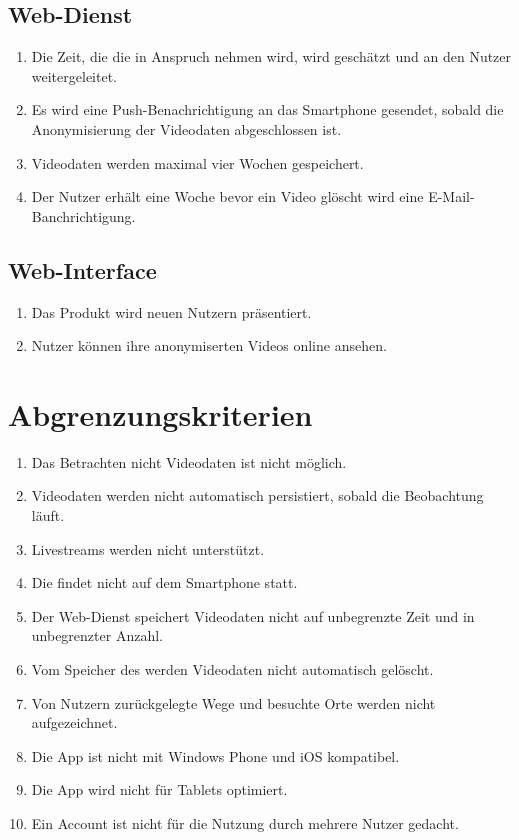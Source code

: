 \subsection{Web-Dienst}
	\begin{enumerate}
	\renewcommand{\labelenumi}{\textbf{\theenumi}}
	\renewcommand{\theenumi}{WK\arabic{enumi}0}
	\setcounter{enumi}{199}
	\item Die Zeit, die die  in Anspruch nehmen wird, wird geschätzt und an den Nutzer weitergeleitet.
	\item Es wird eine Push-Benachrichtigung an das \gls{Smartphone} gesendet, sobald die Anonymisierung der Videodaten abgeschlossen ist.
	\item Videodaten werden maximal vier Wochen gespeichert.
	\item Der Nutzer erhält eine Woche bevor ein Video glöscht wird eine \gls{E-Mail}-Banchrichtigung.
	\end{enumerate}
\subsection{Web-Interface}
	\begin{enumerate}
	\renewcommand{\labelenumi}{\textbf{\theenumi}}
	\renewcommand{\theenumi}{WK\arabic{enumi}0}
	\setcounter{enumi}{299}
	\item Das Produkt wird neuen Nutzern präsentiert.
	\item Nutzer können ihre anonymiserten Videos online ansehen.
	\end{enumerate}

\section{Abgrenzungskriterien}
	\begin{enumerate}
	\renewcommand{\labelenumi}{\textbf{\theenumi}}
	\renewcommand{\theenumi}{AK\arabic{enumi}0}
	\setcounter{enumi}{99}
	\item Das Betrachten nicht  Videodaten ist nicht möglich.
	\item Videodaten werden nicht automatisch persistiert, sobald die Beobachtung läuft.
	\item \glspl{Livestream} werden nicht unterstützt.
	\item Die  findet nicht auf dem \gls{Smartphone} statt.
	\item Der \gls{Web-Dienst} speichert Videodaten nicht auf unbegrenzte Zeit und in unbegrenzter Anzahl.
	\item Vom Speicher des  werden Videodaten nicht automatisch gelöscht.
	\item Von Nutzern zurückgelegte Wege und besuchte Orte werden nicht aufgezeichnet.
	\item Die \gls{App} ist nicht mit \gls{Windows Phone} und \gls{iOS} kompatibel.
	\item Die \gls{App} wird nicht für \glspl{Tablet} optimiert.
	\item Ein Account ist nicht für die Nutzung durch mehrere Nutzer gedacht.
	\end{enumerate}
